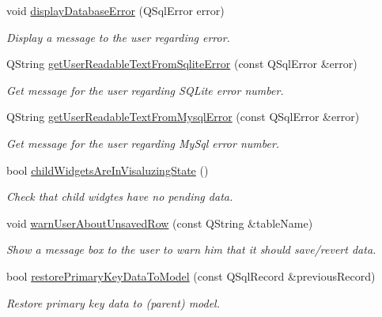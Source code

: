 \begin{DoxyCompactItemize}
void \hyperlink{classmdt_abstract_sql_widget_a3401020fed292da2c3b565a536f0be47}{displayDatabaseError} (QSqlError error)
\begin{DoxyCompactList}\small\item\em Display a message to the user regarding error. \end{DoxyCompactList}\item 
\hypertarget{classmdt_abstract_sql_widget_aeeddeec556cc20c5c9a49559df7898d9}{
QString \hyperlink{classmdt_abstract_sql_widget_aeeddeec556cc20c5c9a49559df7898d9}{getUserReadableTextFromSqliteError} (const QSqlError \&error)}
\label{classmdt_abstract_sql_widget_aeeddeec556cc20c5c9a49559df7898d9}

\begin{DoxyCompactList}\small\item\em Get message for the user regarding SQLite error number. \end{DoxyCompactList}\item 
\hypertarget{classmdt_abstract_sql_widget_a1081ced9b96f60b3b39c6085bfe305d4}{
QString \hyperlink{classmdt_abstract_sql_widget_a1081ced9b96f60b3b39c6085bfe305d4}{getUserReadableTextFromMysqlError} (const QSqlError \&error)}
\label{classmdt_abstract_sql_widget_a1081ced9b96f60b3b39c6085bfe305d4}

\begin{DoxyCompactList}\small\item\em Get message for the user regarding MySql error number. \end{DoxyCompactList}\item 
bool \hyperlink{classmdt_abstract_sql_widget_aebd051866b148eb6f60a10c6ac648efa}{childWidgetsAreInVisaluzingState} ()
\begin{DoxyCompactList}\small\item\em Check that child widgtes have no pending data. \end{DoxyCompactList}\item 
\hypertarget{classmdt_abstract_sql_widget_ad20a178299c96790587b53380bb68282}{
void \hyperlink{classmdt_abstract_sql_widget_ad20a178299c96790587b53380bb68282}{warnUserAboutUnsavedRow} (const QString \&tableName)}
\label{classmdt_abstract_sql_widget_ad20a178299c96790587b53380bb68282}

\begin{DoxyCompactList}\small\item\em Show a message box to the user to warn him that it should save/revert data. \end{DoxyCompactList}\item 
bool \hyperlink{classmdt_abstract_sql_widget_ac93226881ba03311a6a95ecd2ddaa003}{restorePrimaryKeyDataToModel} (const QSqlRecord \&previousRecord)
\begin{DoxyCompactList}\small\item\em Restore primary key data to (parent) model. \end{DoxyCompactList}\end{DoxyCompactItemize}


